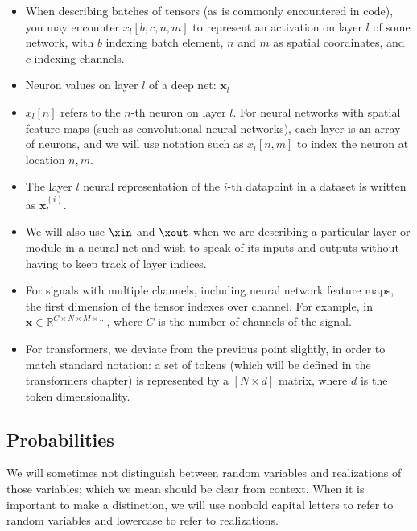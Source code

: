 \begin{itemize}
\item When describing batches of tensors (as is commonly encountered in code), you may encounter $x_l[b,c,n,m]$ to represent an activation on layer $l$ of some network, with $b$ indexing batch element, $n$ and $m$ as spatial coordinates, and $c$ indexing channels.
\item Neuron values on layer $l$ of a deep net: $\mathbf{x}_{l}$
\item $x_{l}[n]$ refers to the $n$-th neuron on layer $l$. For neural networks with spatial feature maps (such as convolutional neural networks), each layer is an array of neurons, and we will use notation such as $x_{l}[n,m]$ to index the neuron at location $n,m$.
\item The layer $l$ neural representation of the $i$-th datapoint in a dataset is written as $\mathbf{x}^{(i)}_{l}$.
\item We will also use $\xin$ and $\xout$ when we are describing a particular layer or module in a neural net and wish to speak of its inputs and outputs without having to keep track of layer indices.
\item For signals with multiple channels, including neural network feature maps, the first dimension of the tensor indexes over channel. For example, in $\mathbf{x} \in \mathbb{R}^{C \times N \times M \times \ldots}$, where $C$ is the number of channels of the signal.
\item For transformers, we deviate from the previous point slightly, in order to match standard notation: a set of tokens (which will be defined in the transformers chapter) is represented by a $[N \times d]$ matrix, where $d$ is the token dimensionality.
\end{itemize}


\subsection*{Probabilities}

We will sometimes not distinguish between random variables and realizations of those variables; which we mean should be clear from context. When it is important to make a distinction, we will use nonbold capital letters to refer to random variables and lowercase to refer to realizations.

